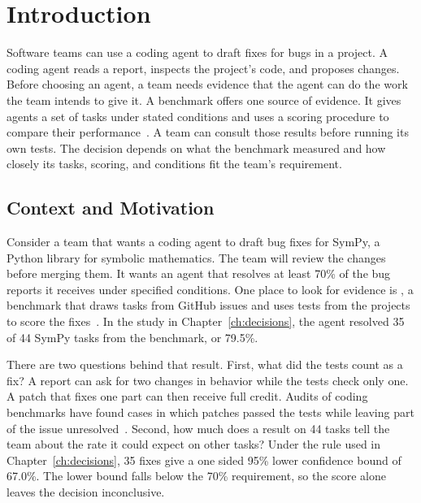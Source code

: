 \chapter{Introduction}
\label{ch:introduction}

Software teams can use a coding agent to draft fixes for bugs in a project. A coding agent reads a report, inspects the project's code, and proposes changes. Before choosing an agent, a team needs evidence that the agent can do the work the team intends to give it. A benchmark offers one source of evidence. It gives agents a set of tasks under stated conditions and uses a scoring procedure to compare their performance~\cite{jimenez_swebench_2024,hu_se_benchmarks_2025}. A team can consult those results before running its own tests. The decision depends on what the benchmark measured and how closely its tasks, scoring, and conditions fit the team's requirement.

\section{Context and Motivation}
\label{sec:intro_motivation}

Consider a team that wants a coding agent to draft bug fixes for SymPy, a Python library for symbolic mathematics. The team will review the changes before merging them. It wants an agent that resolves at least 70\% of the bug reports it receives under specified conditions. One place to look for evidence is \swebench{}, a benchmark that draws tasks from GitHub issues and uses tests from the projects to score the fixes~\cite{jimenez_swebench_2024,openai_swebench_verified_2024}. In the study in Chapter~\ref{ch:decisions}, the agent resolved 35 of 44 SymPy tasks from the benchmark, or 79.5\%.

There are two questions behind that result. First, what did the tests count as a fix? A report can ask for two changes in behavior while the tests check only one. A patch that fixes one part can then receive full credit. Audits of coding benchmarks have found cases in which patches passed the tests while leaving part of the issue unresolved~\cite{yu_utboost_2025,wang_solved_issues_2026}. Second, how much does a result on 44 tasks tell the team about the rate it could expect on other tasks? Under the rule used in Chapter~\ref{ch:decisions}, 35 fixes give a one sided 95\% lower confidence bound of 67.0\%. The lower bound falls below the 70\% requirement, so the score alone leaves the decision inconclusive.

